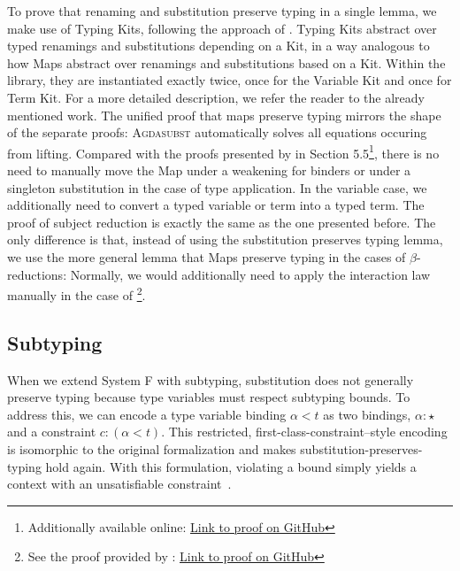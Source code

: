 \documentclass[screen,nonacm]{acmart}
\begin{document}
\noindent To prove that renaming and substitution preserve typing in a single lemma, we
make use of Typing Kits, following the approach of \citet{saffrich:LIPIcs.ITP.2024.32}. Typing
Kits abstract over typed renamings and substitutions depending on a Kit, in a
way analogous to how Maps abstract over renamings and substitutions based on
a Kit. Within the library, they are instantiated exactly twice, once for the
Variable Kit and once for Term Kit. For a
more detailed description, we refer the reader to the already mentioned work.
The unified proof that maps preserve typing mirrors the shape of the separate
proofs: \SFSPT{}\textsc{Agdasubst} automatically solves all equations occuring
from lifting. Compared with the proofs presented by
\citet{saffrich:LIPIcs.ITP.2024.32} in Section 5.5\footnote{Additionally available online: \href{https://github.com/m0rphism/kitty/blob/bc86948c60f2d827593ad23e539197f9660178aa/src/Kitty/Examples/SystemF/SubjectReduction.agda\#L9}{Link to proof on GitHub}}, there is no need to
manually move the Map under a weakening for binders or under a singleton
substitution in the case of type application.
In the variable case, we additionally need to convert a typed
variable or term into a typed term. The proof of subject reduction is exactly the
same as the one presented before. The only difference is that, instead of using
the substitution preserves typing lemma, we use the more general lemma that
Maps preserve typing in the cases of $β$-reductions: \SFSR{}
Normally, we would additionally need to apply the interaction law manually in
the case of \footnote{See the proof provided by
      \citet{saffrich:LIPIcs.ITP.2024.32}:
      \href{https://github.com/m0rphism/kitty/blob/bc86948c60f2d827593ad23e539197f9660178aa/src/Kitty/Examples/SystemF/SubjectReduction.agda\#L32}{Link
            to proof on GitHub}}.

\subsection*{Subtyping}
When we extend System F with subtyping\cite{CARDELLI19944}, substitution does
not generally preserve typing because type variables must respect subtyping
bounds. To address this, we can encode a type variable binding $α < t$ as two
bindings, $α : \star$ and a constraint $c : (α < t)$. This restricted,
first-class-constraint–style encoding is isomorphic to the original
formalization and makes substitution-preserves-typing hold again. With this
formulation, violating a bound simply yields a context with an unsatisfiable
constraint~\cite{saffrich:LIPIcs.ITP.2024.32}.
\end{document}
